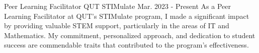 
\begin{cventries}

  \cventry
    {Peer Learning Facilitator} %
    {QUT STIMulate} %
    {} %
    {Mar. 2023 - Present} %
    {As a Peer Learning Facilitator at QUT's STIMulate program, I made a significant impact by providing valuable STEM support, particularly in the areas of IT and Mathematics. My commitment, personalized approach, and dedication to student success are commendable traits that contributed to the program's effectiveness.}

\end{cventries}


